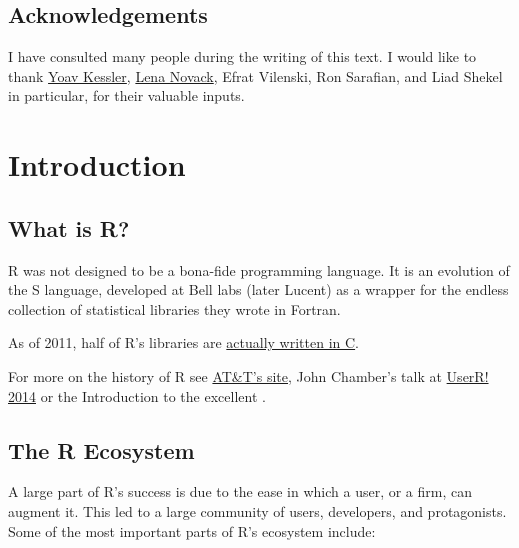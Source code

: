 \documentclass[]{book}
\theoremstyle{definition}
\theoremstyle{definition}
\theoremstyle{definition}
\theoremstyle{remark}
\begin{document}
\section{Acknowledgements}\label{acknowledgements}

I have consulted many people during the writing of this text. I would
like to thank \href{https://kesslerlab.wordpress.com/}{Yoav Kessler},
\href{http://fohs.bgu.ac.il/research/profileBrief.aspx?id=VeeMVried}{Lena
Novack}, Efrat Vilenski, Ron Sarafian, and Liad Shekel in particular,
for their valuable inputs.

\chapter{Introduction}\label{intro}

\section{What is R?}\label{what-r}

R was not designed to be a bona-fide programming language. It is an
evolution of the S language, developed at Bell labs (later Lucent) as a
wrapper for the endless collection of statistical libraries they wrote
in Fortran.

As of 2011, half of R's libraries are
\href{https://wrathematics.github.io/2011/08/27/how-much-of-r-is-written-in-r/}{actually
written in C}.

For more on the history of R see
\href{http://www.research.att.com/articles/featured_stories/2013_09/201309_SandR.html?fbid=Yxy4qyQzmMa}{AT\&T's
site}, John Chamber's talk at
\href{https://www.youtube.com/watch?v=_hcpuRB5nGs}{UserR! 2014} or the
Introduction to the excellent \citet{venables2013modern}.

\hypertarget{ecosystem}{\section{The R Ecosystem}\label{ecosystem}}

A large part of R's success is due to the ease in which a user, or a
firm, can augment it. This led to a large community of users,
developers, and protagonists. Some of the most important parts of R's
ecosystem include:
\end{document}
